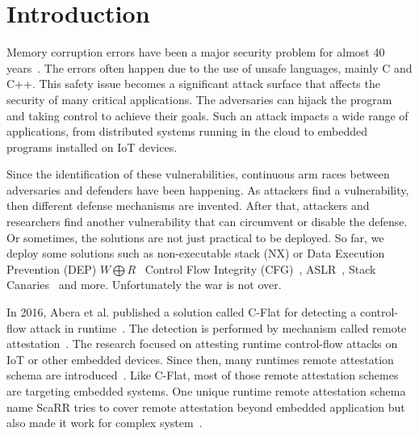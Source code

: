 
\chapter{Introduction} %

\label{Chapter1} %

Memory corruption errors have been a major security problem for almost 40
years~\cite{szekeresSoKEternalWar2013,vanderveenMemoryErrorsPresent2012}. The
errors often happen due to the use of unsafe languages, mainly C and C++. This
safety issue becomes a significant attack surface that affects the security of
many critical applications. The adversaries can hijack the program and taking
control to achieve their goals. Such an attack impacts a wide range of
applications, from distributed systems running in the cloud to embedded programs
installed on IoT devices. 

Since the identification of these vulnerabilities, continuous arm races between
adversaries and defenders have been happening. As attackers find a
vulnerability, then different defense mechanisms are invented. After that,
attackers and researchers find another vulnerability that can circumvent or
disable the defense. Or sometimes, the solutions are not just practical to be
deployed. So far, we deploy some solutions such as non-executable stack (NX) or
Data Execution Prevention (DEP)  \( W \bigoplus R
\)~\cite{vanderveenMemoryErrorsPresent2012} Control Flow Integrity
(CFG)~\cite{abadiControlFlowIntegrityPrinciples2005},
ASLR~\cite{kilAddressSpaceLayout2006}, Stack
Canaries~\cite{baratlooTransparentRunTimeDefense2000} and more. Unfortunately
the war is not over.

In 2016, Abera et al. published a solution called C-Flat for detecting a
control-flow attack in runtime~\cite{aberaCFLATControlFlowAttestation2016}. The
detection is performed by mechanism called remote
attestation~\cite{haldarSemanticRemoteAttestationA2004}. The research focused on
attesting runtime control-flow attacks on IoT or other embedded devices. Since
then, many runtimes remote attestation schema are
introduced~\cite{dessoukyLOFATLowOverheadControl2017,
zeitouniATRIUMRuntimeAttestation2017, kohnhauserSCAPIScalableAttestation2017,
dessoukyLiteHAXLightweightHardwareassisted2018, aberaDIATDataIntegrity2019,
koutroumpouchosSecureEdgeComputing2019, sunOATAttestingOperation2020}. Like
C-Flat, most of those remote attestation schemes are targeting embedded systems.
One unique runtime remote attestation schema name ScaRR tries to cover remote
attestation beyond embedded application but also made it work for complex
system~\cite{toffaliniScaRRScalableRuntime2019}. 

